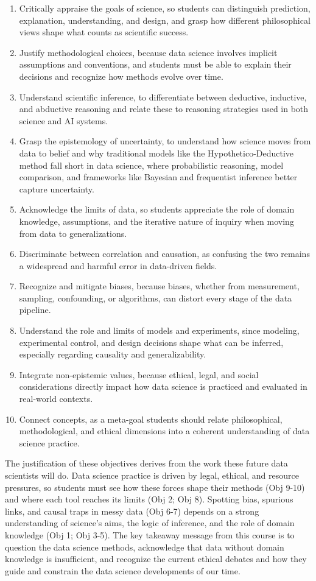 \documentclass[
  12pt,
]{book}
\begin{document}
\begin{enumerate}
\def\labelenumi{\arabic{enumi}.}
\item
  Critically appraise the goals of science, so students can distinguish prediction, explanation, understanding, and design, and grasp how different philosophical views shape what counts as scientific success.
\item
  Justify methodological choices, because data science involves implicit assumptions and conventions, and students must be able to explain their decisions and recognize how methods evolve over time.
\item
  Understand scientific inference, to differentiate between deductive, inductive, and abductive reasoning and relate these to reasoning strategies used in both science and AI systems.
\item
  Grasp the epistemology of uncertainty, to understand how science moves from data to belief and why traditional models like the Hypothetico-Deductive method fall short in data science, where probabilistic reasoning, model comparison, and frameworks like Bayesian and frequentist inference better capture uncertainty.
\item
  Acknowledge the limits of data, so students appreciate the role of domain knowledge, assumptions, and the iterative nature of inquiry when moving from data to generalizations.
\item
  Discriminate between correlation and causation, as confusing the two remains a widespread and harmful error in data-driven fields.
\item
  Recognize and mitigate biases, because biases, whether from measurement, sampling, confounding, or algorithms, can distort every stage of the data pipeline.
\item
  Understand the role and limits of models and experiments, since modeling, experimental control, and design decisions shape what can be inferred, especially regarding causality and generalizability.
\item
  Integrate non-epistemic values, because ethical, legal, and social considerations directly impact how data science is practiced and evaluated in real-world contexts.
\item
  Connect concepts, as a meta-goal students should relate philosophical, methodological, and ethical dimensions into a coherent understanding of data science practice.
\end{enumerate}

The justification of these objectives derives from the work these future data scientists will do. Data science practice is driven by legal, ethical, and resource pressures, so students must see how these forces shape their methods (Obj 9-10) and where each tool reaches its limits (Obj 2; Obj 8). Spotting bias, spurious links, and causal traps in messy data (Obj 6-7) depends on a strong understanding of science's aims, the logic of inference, and the role of domain knowledge (Obj 1; Obj 3-5). The key takeaway message from this course is to question the data science methods, acknowledge that data without domain knowledge is insufficient, and recognize the current ethical debates and how they guide and constrain the data science developments of our time.
\end{document}
